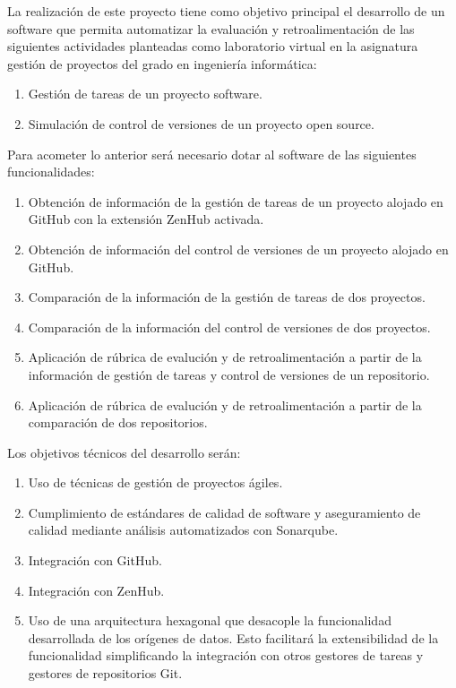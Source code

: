 
La realización de este proyecto tiene como objetivo principal el desarrollo de un software que permita automatizar la evaluación y retroalimentación de las siguientes actividades planteadas como laboratorio virtual en la asignatura gestión de proyectos del grado en ingeniería informática:

\begin{enumerate}
	\item Gestión de tareas de un proyecto software. 
	\item Simulación de control de versiones de un proyecto open source.
\end{enumerate}

Para acometer lo anterior será necesario dotar al software de las siguientes funcionalidades:

\begin{enumerate}
	\item Obtención de información de la gestión de tareas de un proyecto alojado en GitHub con la extensión ZenHub activada.	
	\item Obtención de información del control de versiones de un proyecto alojado en GitHub.
	\item Comparación de la información de la gestión de tareas de dos proyectos.
	\item Comparación de la información del control de versiones de dos proyectos.			
	\item Aplicación de rúbrica de evalución y de retroalimentación a partir de la información de gestión de tareas y control de versiones de un repositorio.
	\item Aplicación de rúbrica de evalución y de retroalimentación a partir de la comparación de dos repositorios.	 		  
\end{enumerate}

Los objetivos  técnicos del desarrollo serán:

\begin{enumerate}
	\item Uso de técnicas de gestión de proyectos ágiles.
	\item Cumplimiento de estándares de calidad de software y aseguramiento de calidad mediante análisis automatizados con Sonarqube.
	\item Integración con GitHub. 
	\item Integración con ZenHub.
	\item Uso de una arquitectura hexagonal \cite{hexagonal-architecture} que desacople la funcionalidad desarrollada de los orígenes de datos. Esto facilitará la extensibilidad de la funcionalidad simplificando la  integración con otros gestores de tareas y gestores de repositorios Git.
\end{enumerate}

